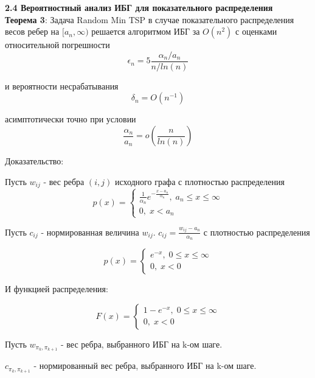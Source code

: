 \documentclass[a4paper, 14pt]{extarticle}
\begin{document}
\textbf{2.4 Вероятностный анализ ИБГ для показательного распределения}\\

\textbf{Теорема 3}: Задача Random Min TSP в случае показательного распределения весов ребер на $[a_n,\infty)$ решается алгоритмом ИБГ за $O(n^2)$ с оценками относительной погрешности
\begin{equation}
\epsilon_n = 5 \frac{\alpha_n/a_n}{n/ln(n)}
\end{equation}

и вероятности несрабатывания
\begin{equation}
\delta_n = O(n^{-1})
\end{equation}

асимптотически точно при условии
\begin{equation}
\frac{\alpha_n}{a_n} = o(\frac{n}{ln(n)})
\end{equation}

Доказательство:

Пусть $w_{ij}$ - вес ребра $(i, j)$ исходного графа с плотностью распределения
\begin{equation}
p(x) = \begin{cases}
\frac{1}{\alpha_n} e^{-\frac{x-a_n}{\alpha_n}}, \; a_n \leq x \leq \infty \\
0, \; x < a_n
\end{cases}
\end{equation}

Пусть $c_{ij}$ - нормированная величина $w_{ij}$. $c_{ij} = \frac{w_{ij}-a_n}{\alpha_n}$  с плотностью распределения

\begin{equation}
p(x) = \begin{cases}
 e^{-x}, \; 0 \leq x \leq \infty \\
0, \; x < 0
\end{cases}
\end{equation}

И функцией распределения:

\begin{equation}
F(x) = \begin{cases}
 1-e^{-x}, \; 0 \leq x \leq \infty \\
0, \; x < 0
\end{cases}
\end{equation}

Пусть $w_{\pi_k, \pi_{k+1}}$ - вес ребра, выбранного ИБГ на k-ом шаге.

$c_{\pi_k, \pi_{k+1}}$ - нормированный вес ребра, выбранного ИБГ на k-ом шаге.
\end{document}
